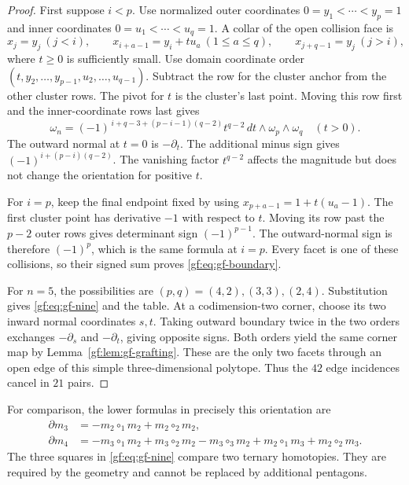 \begin{proof}
First suppose \(i<p\).  Use normalized outer coordinates
\(0=y_1<\cdots<y_p=1\) and inner coordinates
\(0=u_1<\cdots<u_q=1\).  A collar of the open collision face is
\[
 x_j=y_j\ (j<i),\qquad
 x_{i+a-1}=y_i+t u_a\ (1\leq a\leq q),\qquad
 x_{j+q-1}=y_j\ (j>i),
\]
where \(t\geq0\) is sufficiently small.
Use domain coordinate order
\((t,y_2,\ldots,y_{p-1},u_2,\ldots,u_{q-1})\).
Subtract the row for the cluster anchor from the other cluster rows.
The pivot for \(t\) is the cluster's last point.
Moving this row first and the inner-coordinate rows last gives
\[
 \omega_n=
 (-1)^{\,i+q-3+(p-i-1)(q-2)}t^{q-2}
 \,dt\wedge\omega_p\wedge\omega_q
 \quad(t>0).
\]
The outward normal at \(t=0\) is \(-\partial_t\).
The additional minus sign gives
\((-1)^{i+(p-i)(q-2)}\).
The vanishing factor \(t^{q-2}\) affects the magnitude but
does not change the orientation for positive \(t\).

For \(i=p\), keep the final endpoint fixed by using
\(x_{p+a-1}=1+t(u_a-1)\).
The first cluster point has derivative \(-1\) with respect to \(t\).
Moving its row past the \(p-2\) outer rows gives determinant
sign \((-1)^{p-1}\).  The outward-normal sign is therefore
\((-1)^p\), which is the same formula at \(i=p\).
Every facet is one of these collisions, so their signed sum proves
\eqref{gf:eq:gf-boundary}.

For \(n=5\), the possibilities are \((p,q)=(4,2),(3,3),(2,4)\).
Substitution gives \eqref{gf:eq:gf-nine} and the table.
At a codimension-two corner, choose its two inward normal coordinates
\(s,t\).  Taking outward boundary twice in the two orders
exchanges \(-\partial_s\) and \(-\partial_t\), giving opposite signs.
Both orders yield the same corner map by Lemma~\ref{gf:lem:gf-grafting}.
These are the only two facets through an open edge of this simple
three-dimensional polytope.  Thus the \(42\) edge incidences cancel
in \(21\) pairs.
\end{proof}

For comparison, the lower formulas in precisely this orientation are
\begin{align*}
 \partial m_3&=-m_2\circ_1m_2+m_2\circ_2m_2,\\
 \partial m_4&=-m_3\circ_1m_2+m_3\circ_2m_2-m_3\circ_3m_2
                  +m_2\circ_1m_3+m_2\circ_2m_3.
\end{align*}
The three squares in \eqref{gf:eq:gf-nine} compare two ternary
homotopies.  They are required by the geometry and cannot be
replaced by additional pentagons.


